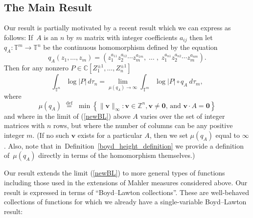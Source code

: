 \documentclass[12pt]{amsart}
\theoremstyle{plain}
\theoremstyle{definition}
\theoremstyle{remark}
\numberwithin{theorem}{section}
\numberwithin{equation}{section} %
\newcommand{\defeq}{\stackrel{\mathrm{def}}{\, = \,}}
\newcommand{\bZ}{{\mathbb{Z}}}
\newcommand{\bC}{{\mathbb{C}}}
\newcommand{\mb}{\mathbf}
\newcommand{\torus}{{\mathbb{T}}}
\begin{document}

\subsection{The Main Result}

Our result is partially motivated by a recent result \cite[Theorem~1.1 in their general form given in Theorem 3.1] {Brunault2024} which we can express as follows:
If~$A$ is an $n$ by $m$ matrix with integer coefficients $a_{ij}$
then let~$q_A \colon \torus^m \to \torus^n$
be the continuous homomorphism
defined by the equation
$$
q_A \left(z_1, \ldots, z_m\right) 
=
\left( z_1^{a_{11}}  z_2^{a_{12}} \cdots  z_m^{a_{1m}},  \;  \ldots \; , \; z_1^{a_{n1}}  z_2^{a_{n2}} \cdots  z_m^{a_{nm}} 
\right).
$$
Then for any nonzero $P \in  \bC\left[Z^{\pm 1}_1, \ldots, Z^{\pm 1}_n\right]$ 
\begin{equation} \label{newBL}
\int_{\torus^n}  \log |P| \, d \tau_n  = \lim_{\mu\left(q_A\right) \to \infty}  \int_{\torus^m}  \log |P| \circ q_A \ d \tau_m,
\end{equation}
where
$$
\mu\left(q_A\right) 
\; \defeq \;  
\min 
\left\{ \| \mb v\|_\infty  \colon
    \text{$\mb v \in \bZ^n, \mb v \ne {\mb 0}$, and $\mb v \cdot A = \mb 0$} 
 \right\}
$$
and where in the limit of  (\ref{newBL}) above $A$ varies over the set of integer matrices with $n$ rows, but where the number of 
columns can be any positive integer $m$. (If no such $\mb v$ exists for a particular $A$, then we set $\mu (q_A)$ equal to $\infty$.
Also, note that in~Definition~\ref{boyd_height_definition} we provide a definition of~$\mu\left(q_{A}\right)$ directly in terms of the homomorphism themselves.)


Our result extends the limit (\ref{newBL}) to more general types of functions including those used in the extensions  of Mahler measures considered above.
Our result is expressed  in terms of ``Boyd--Lawton collections''. These are well-behaved collections of functions for which we
already have a single-variable Boyd--Lawton result:
\end{document}
